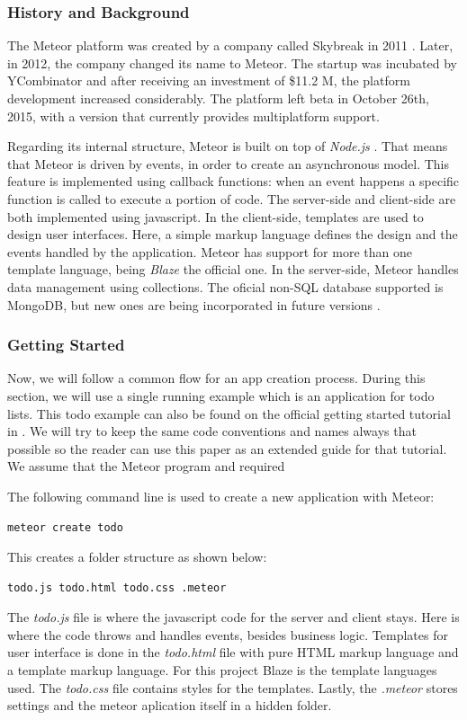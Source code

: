 \subsubsection{History and Background}

The Meteor platform was created by a company called Skybreak in 2011 \cite{skybreak}.
Later, in 2012, the company changed its name to Meteor.
The startup was incubated by YCombinator \cite{ycomb} and after receiving an investment of \$11.2 M, the platform development increased considerably.
The platform left beta in October 26th, 2015, with a version that currently provides multiplatform support.

Regarding its internal structure, Meteor is built on top of \emph{Node.js} \cite{node}.
That means that Meteor is driven by events, in order to create an asynchronous model.
This feature is implemented using callback functions: when an event happens a specific function is called to execute a portion of code.
The server-side and client-side are both implemented using javascript.
In the client-side, templates are used to design user interfaces.
Here, a simple markup language defines the design and the events handled by the application.
Meteor has support for more than one template language, being \emph{Blaze} \cite{meteor} the official one.
In the server-side, Meteor handles data management using collections.
The oficial non-SQL database supported is MongoDB, but new ones are being incorporated in future versions \cite{fathom}.


\subsubsection{Getting Started}

Now, we will follow a common flow for an app creation process.
During this section, we will use a single running example which is an application for todo lists.
This todo example can also be found on the official getting started tutorial in \cite{meteor}.
We will try to keep the same code conventions and names always that possible so the reader can use this paper as an extended guide for that tutorial.
We assume that the Meteor program and required 

The following command line is used to create a new application with Meteor:
\begin{lstlisting}[language=bash]
meteor create todo
\end{lstlisting}
This creates a folder structure as shown below:
\begin{lstlisting}[language=bash]
todo.js todo.html todo.css .meteor
\end{lstlisting}
The \emph{todo.js} file is where the javascript code for the server and client stays.
Here is where the code throws and handles events, besides business logic.
Templates for user interface is done in the \emph{todo.html} file with pure HTML markup language and a template markup language.
For this project Blaze is the template languages used.
The \emph{todo.css} file contains styles for the templates.
Lastly, the \emph{.meteor} stores settings and the meteor aplication itself in a hidden folder.

